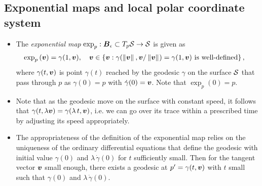 \documentclass[11pt]{article}
\begin{document}
\newpage
\subsection{Exponential maps and local polar coordinate system}
\begin{itemize}
\item  \begin{definition}
The \emph{exponential map} $\exp_{p}: \boldsymbol{B}_{\epsilon}\subset T_{p}{\mathcal S} \rightarrow {\mathcal S}$ is given as 
\begin{align*}
\exp_{p}\left(\boldsymbol{v}\right) &= \gamma(1, \boldsymbol{v}), \quad \boldsymbol{v} \in \left\{\boldsymbol{v}: \gamma(\left\|\boldsymbol{v}\right\|_{}, \boldsymbol{v}/\left\|\boldsymbol{v}\right\|_{})=\gamma(1, \boldsymbol{v})\text{ is well-defined}\right\},
\end{align*}
where $\gamma(t, \boldsymbol{v})$ is point $\gamma(t)$ reached by the geodesic  $\gamma$ on the surface ${\mathcal S}$ that pass through $p$ as $\gamma(0) = p$ with $\dot{\gamma}(0) = \boldsymbol{v}$. Note that $\exp_{p}(0) = p$.
 \end{definition}

\item \begin{remark}
Note that as the geodesic move on the surface with constant speed, it follows that $\gamma(t, \lambda\boldsymbol{v}) = \gamma(\lambda\,t, \boldsymbol{v})$, i.e. we can go over its trace within a prescribed time by adjusting its speed appropriately. 
\end{remark}

\item \begin{remark}
The appropriateness of the definition of the exponential map relies on the uniqueness of the ordinary differential equations that define the geodesic with initial value $\gamma(0)$ and $\lambda\,\dot{\gamma}(0)$ for $t$ sufficiently small. Then for the tangent vector $\boldsymbol{v}$ small enough, there exists a geodesic at $p'= \gamma(t,\boldsymbol{v})$ with $t$ small such that $\gamma(0)$ and $\lambda\,\dot{\gamma}(0)$.
\end{remark}


\end{itemize}
\end{document}
